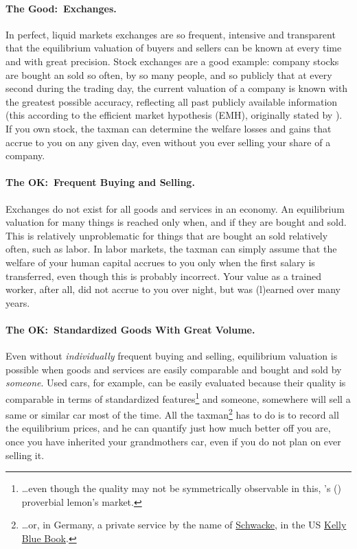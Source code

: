 \paragraph{The Good:~Exchanges.} In perfect, liquid markets exchanges are so frequent, intensive and transparent that the equilibrium valuation of  buyers and sellers can be known at every time and with great precision.
Stock exchanges are a good example:
company stocks are bought an sold so often, by so many people, and so publicly that at every second during the trading day, the current valuation of a company is known with the greatest possible accuracy, reflecting all past publicly available information (this according to the efficient market hypothesis (EMH), originally stated by \citealt{Cowles1937}).
If you own stock, the taxman can determine the welfare losses and gains that accrue to you on any given day, even without you ever selling your share of a company.

\paragraph{The OK:~Frequent Buying and Selling.} Exchanges do not exist for all goods and services in an economy.
An equilibrium valuation for many things is reached only when, and if they are bought and sold.
This is relatively unproblematic for things that are bought an sold relatively often, such as labor.
In labor markets, the taxman can simply assume that the welfare of your human capital accrues to you only when the first salary is transferred, even though this is probably incorrect.
Your value as a trained worker, after all, did not accrue to you over night, but was (l)earned over many years.

\paragraph{The OK:~Standardized Goods With Great Volume.} Even without \emph{individually} frequent buying and selling, equilibrium valuation is possible when goods and services are easily comparable and bought and sold by \emph{someone}.
Used cars, for example, can be easily evaluated because their quality is comparable in terms of standardized features\footnote{\ldots even though the quality may not be symmetrically observable in this, \citeauthor{Akerlof-1970-aa}'s (\citeyear{Akerlof-1970-aa}) proverbial lemon's market.} and someone, somewhere will sell a same or similar car most of the time.
All the taxman\footnote{\ldots or, in Germany, a private service by the name of \href{http://www.schwacke.de/}{Schwacke}, in the US \href{http://www.kbb.com/}{Kelly Blue Book}.} has to do is to record all the equilibrium prices, and he can quantify just how much better off you are, once you have inherited your grandmothers car, even if you do not plan on ever selling it.

